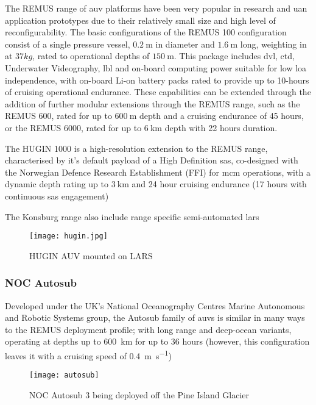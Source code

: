 The REMUS range of \gls{auv} platforms have been very popular in research and \gls{uan} application prototypes due to their relatively small size and high level of reconfigurability.
The basic configurations of the REMUS 100 configuration consist of a single pressure vessel, $\SI{0.2}{\meter}$ in diameter and $\SI{1.6}{\meter}$ long, weighting in at $37kg$, rated to operational depths of $\SI{150}{\meter}$. 
This package includes \gls{dvl}, \gls{ctd}, Underwater Videography, \gls{lbl} and on-board computing power suitable for low \gls{loa} independence, with on-board Li-on battery packs rated to provide up to 10-hours of cruising operational endurance.
These capabilities can be extended through the addition of further modular extensions through the REMUS range, such as the REMUS 600, rated for up to $\SI{600}{\meter}$ depth and a cruising endurance of 45 hours, or the REMUS 6000, rated for up to $\SI{6}{\kilo\meter}$ depth with 22 hours duration.

The HUGIN 1000 is a high-resolution extension to the REMUS range, characterised by it's default payload of a High Definition \gls{sas}, co-designed with the Norwegian Defence Research Establishment (FFI) for \gls{mcm} operations, with a dynamic depth rating up to $\SI{3}{\kilo\meter}$ and 24 hour cruising endurance (17 hours with continuous \gls{sas} engagement)

The Konsburg range also include range specific semi-automated \gls{lars}
\begin{figure}[h]
	\centering
	\texttt{[image: hugin.jpg]}
	\caption{\label{fig:hugin}HUGIN AUV mounted on LARS}
\end{figure}
\subsubsection{NOC Autosub}

Developed under the UK's National Oceanography Centres Marine Autonomous and Robotic Systems group, the Autosub family of \glspl{auv} is similar in many ways to the REMUS deployment profile; with long range and deep-ocean variants, operating at depths up to \SI{600}{\kilo\meter} for up to 36 hours (however, this configuration leaves it with a cruising speed of \SI{0.4}{\meter\per\second})
\begin{figure}[h]
	\centering
	\texttt{[image: autosub]}
	\caption{\label{fig:autosub}NOC Autosub 3 being deployed off the Pine Island Glacier}
\end{figure}

